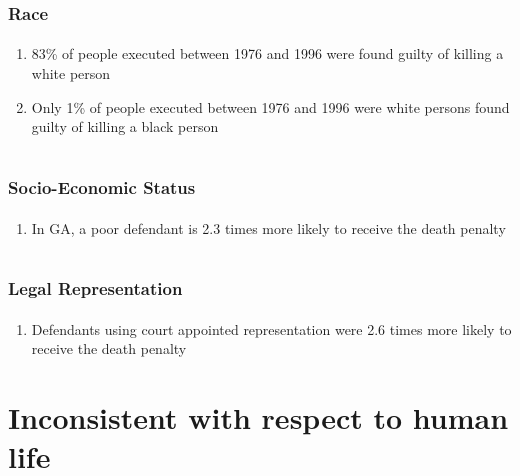 \documentclass{beamer}
\begin{document}
\begin{frame}
    \frametitle{Race}
    \framesubtitle{}
\begin{enumerate}
\item 83\% of people executed between 1976 and 1996 were found guilty of 
killing a white person
\item Only 1\% of people executed between 1976 and 1996 were white 
persons found guilty of killing a black person


\end{enumerate}



\end{frame}


\section{}

\begin{frame}
    \frametitle{Socio-Economic Status}
    \framesubtitle{}
\begin{enumerate}
\item In GA, a poor defendant is 2.3 times more likely to receive the 
death penalty


\end{enumerate}



\end{frame}


\section{}

\begin{frame}
    \frametitle{Legal Representation}
    \framesubtitle{}
\begin{enumerate}
\item Defendants using court appointed representation were 2.6 times 
more likely to receive the death penalty


\end{enumerate}



\end{frame}


\section{Inconsistent with respect to human life}
\end{document}
